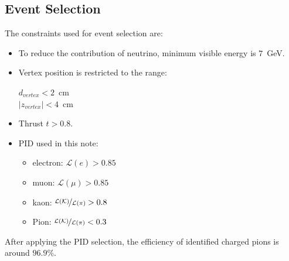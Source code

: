 \subsection{Event Selection}
\label{sec:eventselection}
The constraints used for event selection are:
\begin{itemize}
\item To reduce the contribution of neutrino, minimum visible energy is $7$~GeV.  
\item Vertex position is restricted to the range:
\begin{center}
$d_{vertex}<2$~cm   \\
$\lvert z_{vertex}\rvert < 4$~cm
\end{center}
\item Thrust $t>0.8$.
\item PID used in this note:
\begin{itemize}
  \item electron: $\mathcal{L}(e)>0.85$
  \item muon: $\mathcal{L}(\mu)>0.85$
  \item kaon: $\nicefrac{\mathcal{L}(\mathcal{K})}{\mathcal{L}(\pi)}>0.8$
  \item Pion: $\nicefrac{\mathcal{L}(\mathcal{K})}{\mathcal{L}(\pi)}<0.3$
\end{itemize}
\end{itemize}
After applying the PID selection, the efficiency of identified charged pions is around $96.9\%$.

